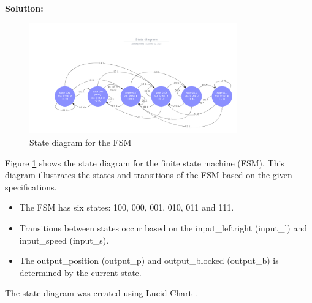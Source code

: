 \textbf{Solution:}

\begin{figure}[h!]
    \centering
    \includegraphics[width=0.8\textwidth]{figures/State diagram.png}
    \caption{State diagram for the FSM}
    \label{fig:state-diagram}
\end{figure}

Figure \ref{fig:state-diagram} shows the state diagram for the finite state machine (FSM). This diagram illustrates the states and transitions of the FSM based on the given specifications.

\begin{itemize}
    \item The FSM has six states: 100, 000, 001, 010, 011 and 111.
    \item Transitions between states occur based on the input\_leftright (input\_l) and input\_speed (input\_s).
    \item The output\_position (output\_p) and output\_blocked (output\_b) is determined by the current state.
\end{itemize}

The state diagram was created using Lucid Chart \cite{lucidchart}.

